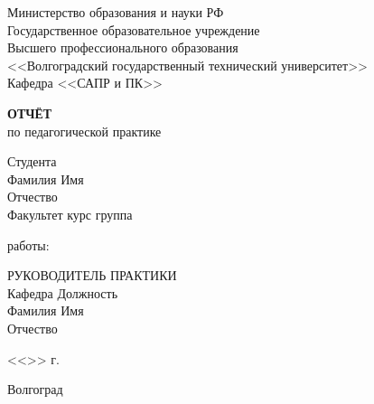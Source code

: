 \documentclass[a4paper, 14pt]{extreport}
\begin{document}
    \begin{titlepage}
        \begin{center}
            Министерство образования и науки РФ \\
            Государственное образовательное учреждение\\
            Высшего профессионального образования\\
            <<Волгоградский государственный технический университет>>\\
            Кафедра <<САПР и ПК>>
        \end{center}
        \vspace{2.0cm}
        \begin{center}
            \large \textbf{ОТЧЁТ} \\
            по педагогической практике
        \end{center}
        \begin{flushleft}
            Студента\\
            Фамилия \underline{\hspace{5cm}} 
            Имя \underline{\hspace{5.1cm}}\\
            Отчество \underline{\hspace{5cm}}\\
            Факультет \underline{\hspace{4.8cm}} курс \underline{\hspace{2cm}} 
            группа \underline{\hspace{4cm}}\\
        \end{flushleft}
        \vspace{1.0cm}
         работы: \underline{\hspace{10cm}}
        \vspace{2.0cm}
        \begin{flushleft}
            РУКОВОДИТЕЛЬ ПРАКТИКИ\\
            Кафедра \underline{\hspace{5cm}} Должность \underline{\hspace{5cm}} \\
            Фамилия \underline{\hspace{4.9cm}} Имя \underline{\hspace{6.5cm}}\\
            Отчество \underline{\hspace{4.9cm}}
        \end{flushleft}
        \vspace{1.5cm}
        \begin{flushright}
            <<\underline{\hspace{1.0cm}}>>\underline{\hspace{4.0cm}} \the\year г.
        \end{flushright}
        \vspace{\fill}
        \begin{center}
            Волгоград \the\year
        \end{center}
    \end{titlepage}
    \tableofcontents
    \onehalfspacing
\end{document}
